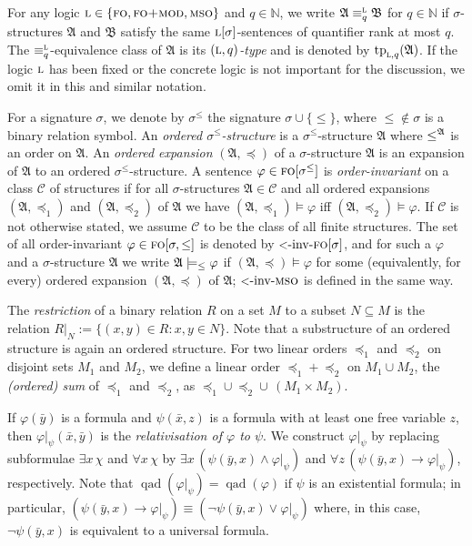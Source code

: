 \documentclass[11pt]{article}
\renewcommand{\phi}{\varphi}
\newcommand{\logic}[1]{\textsc{#1}}
\newcommand{\logl}{\logic{l}}
\newcommand{\FO}{\logic{fo}}
\newcommand{\FOmod}{\logic{fo+mod}}
\newcommand{\MSO}{\logic{mso}}
\newcommand{\ordinv}[1]{\textnormal{{\small \textless}-inv-}#1}
\newcommand{\oiFO}{\ordinv{\FO{}}}
\newcommand{\oiMSO}{\ordinv{\MSO{}}}
\newcommand{\eleq}[1][]{\equiv_{#1}}
\newcommand{\leleq}[1][]{\eleq[#1]^{\logl}}
\newcommand{\qad}[1]{\operatorname{qad}(#1)}
\newcommand{\limplies}{\rightarrow}
\newcommand{\leqsym}{\logic{\ensuremath{\leq}}}
\newcommand{\rela}[2]{\ensuremath{{#1|}_{#2}}}
\DeclareMathOperator{\tp}{tp}
\newcommand{\class}[1]{\mathcal{#1}}
\newcommand{\struct}[1]{\mathfrak{#1}}
\newcommand{\AS}{\struct{A}}
\newcommand{\BS}{\struct{B}}
\newcommand{\set}[1]{\{#1\}}
\newcommand{\N}{\mathbb{N}}
\newcommand{\union}{\cup}
\begin{document}
For any logic $\logl\in \set{\FO{},\FOmod{}, \MSO{}}$ and $q\in \N$, we write
$\AS\leleq[q] \BS$ for $q \in \mathbb{N}$ if $\sigma$-structures $\AS$ and $\BS$
satisfy the same $\logl[\sigma]$-sentences of quantifier rank at most $q$. The
$\leleq[q]$-equivalence class of $\AS$ is its \emph{$(\logl,q)$-type} and is
denoted by $\tp_{\logl,q}(\AS)$.  If the logic $\logl$ has been fixed or the
concrete logic is not important for the discussion, we omit it in this and
similar notation.

For a signature $\sigma$, we denote by $\sigma^{\leq}$ the signature $\sigma
\cup \{{\leq}\}$, where ${\leq} \not\in \sigma$ is a binary relation symbol. An
\emph{ordered $\sigma^{\leq}$-structure} is a $\sigma^{\leq}$-structure $\AS$
where $\leqsym^\AS$ is an order on $\AS$. An \emph{ordered expansion}
$(\AS,\preceq)$ of a $\sigma$-structure $\AS$ is an expansion of $\AS$ to an
ordered $\sigma^{\leq}$-structure. A sentence $\phi \in \FO{}[\sigma^{\leq}]$ is
\emph{order-invariant} on a class $\class{C}$ of structures if for all
$\sigma$-structures $\AS \in \class{C}$ and all ordered expansions
$(\AS,\preceq_1)$ and $(\AS,\preceq_2)$ of $\AS$ we have $(\AS, \preceq_1)
\models \phi$ iff $(\AS, \preceq_2) \models \phi$.  If $\class{C}$ is not
otherwise stated, we assume $\class{C}$ to be the class of all finite
structures. The set of all order-invariant $\phi \in \FO{}[\sigma, \leqsym]$ is
denoted by $\oiFO{}[\sigma]$, and for such a $\phi$ and a $\sigma$-structure
$\AS$ we write $\AS \models_{\leqsym} \phi$ if $(\AS, \preceq) \models \phi$ for
some (equivalently, for every) ordered expansion $(\AS,\preceq)$ of $\AS$;
$\oiMSO{}$ is defined in the same way.

The \emph{restriction} of a binary relation $R$ on a set $M$ to a subset $N
\subseteq M$ is the relation $\rela{R}{N}:=\{(x,y) \in R : x,y \in N\}$. Note
that a substructure of an ordered structure is again an ordered structure.  For
two linear orders $\preceq_1$ and $\preceq_2$ on disjoint sets $M_1$ and $M_2$,
we define a linear order $\preceq_1 + \preceq_2$ on $M_1 \union M_2$, the
\emph{(ordered) sum} of $\preceq_1$ and $\preceq_2$, as $\preceq_1 \cup
\preceq_2 \cup\, (M_1 \times M_2)$.

If $\phi(\bar y)$ is a formula and $\psi(\bar x, z)$ is a formula with at least
one free variable $z$, then $\rela{\phi}{\psi}(\bar x,\bar y)$ is the
\emph{relativisation of $\phi$ to $\psi$}. We construct $\rela{\phi}{\psi}$ by
replacing subformulae $\exists x\, \chi$ and $\forall x\,\chi$ by $\exists
x\,(\psi(\bar y,x) \land \rela{\phi}{\psi})$ and $\forall z\,(\psi(\bar y, x)
\limplies \rela{\phi}{\psi})$, respectively. Note that $\qad{\phi|_\psi} =
\qad{\phi}$ if $\psi$ is an existential formula; in particular, $(\psi(\bar y,
x) \limplies \rela{\phi}{\psi}) \equiv (\lnot\psi(\bar y, x) \lor
\rela{\phi}{\psi})$ where, in this case, $\lnot\psi(\bar y,x)$ is equivalent to
a universal formula.
\end{document}
